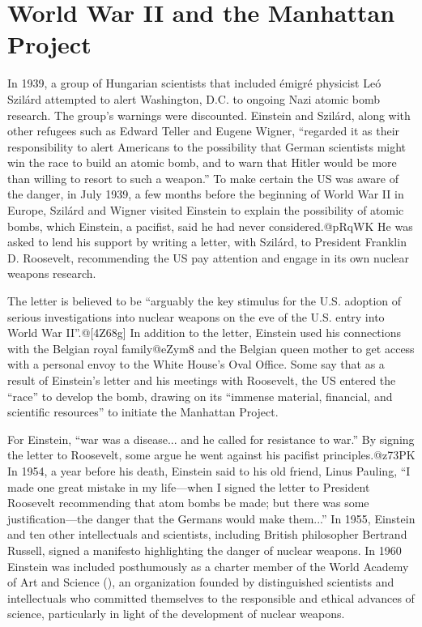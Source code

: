 \documentclass[twoside]{memoir}
\begin{document}
\section{World War II and the Manhattan Project}
In 1939, a group of Hungarian scientists that included émigré physicist Leó Szilárd attempted to alert Washington, D.C. to ongoing Nazi atomic bomb research. The group's warnings were discounted. Einstein and Szilárd, along with other refugees such as Edward Teller and Eugene Wigner, \enquote{regarded it as their responsibility to alert Americans to the possibility that German scientists might win the race to build an atomic bomb, and to warn that Hitler would be more than willing to resort to such a weapon.}\cite{o4fkQ} To make certain the US was aware of the danger, in July 1939, a few months before the beginning of World War II in Europe, Szilárd and Wigner visited Einstein to explain the possibility of atomic bombs, which Einstein, a pacifist, said he had never considered.@pRqWK He was asked to lend his support by writing a letter, with Szilárd, to President Franklin D. Roosevelt, recommending the US pay attention and engage in its own nuclear weapons research.

The letter is believed to be \enquote{arguably the key stimulus for the U.S. adoption of serious investigations into nuclear weapons on the eve of the U.S. entry into World War II}.@[4Z68g] In addition to the letter, Einstein used his connections with the Belgian royal family@eZym8 and the Belgian queen mother to get access with a personal envoy to the White House's Oval Office. Some say that as a result of Einstein's letter and his meetings with Roosevelt, the US entered the \enquote{race} to develop the bomb, drawing on its \enquote{immense material, financial, and scientific resources} to initiate the Manhattan Project.

For Einstein, \enquote{war was a disease... and he called for resistance to war.} By signing the letter to Roosevelt, some argue he went against his pacifist principles.@z73PK In 1954, a year before his death, Einstein said to his old friend, Linus Pauling, \enquote{I made one great mistake in my life---when I signed the letter to President Roosevelt recommending that atom bombs be made; but there was some justification---the danger that the Germans would make them...} In 1955, Einstein and ten other intellectuals and scientists, including British philosopher Bertrand Russell, signed a manifesto highlighting the danger of nuclear weapons. In 1960 Einstein was included posthumously as a charter member of the World Academy of Art and Science (), an organization founded by distinguished scientists and intellectuals who committed themselves to the responsible and ethical advances of science, particularly in light of the development of nuclear weapons.
\end{document}
